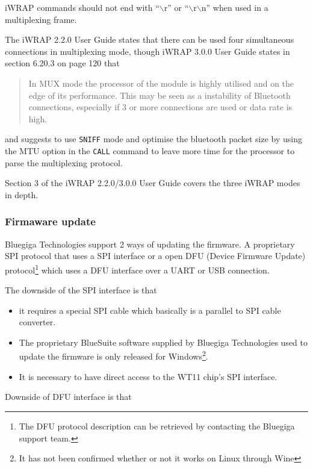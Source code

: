 \documentclass[a4paper, oneside, final]{memoir}
\begin{document}
iWRAP commands should not end with ``$\backslash$r'' or
``$\backslash$r$\backslash$n'' when used in a multiplexing frame.

The iWRAP 2.2.0 User Guide states that there can be used four simultaneous
connections in multiplexing mode, though iWRAP 3.0.0 User Guide\cite{iWRAP300UG}
states in section 6.20.3 on page 120 that 

\begin{quote}
  In MUX mode the processor of the module is highly utilised and on the edge of
  its performance. This may be seen as a instability of Bluetooth connections,
  especially if 3 or more connections are used or data rate is high.
\end{quote}

\noindent
and suggests to use \texttt{SNIFF} mode and optimise the bluetooth packet size
by using the MTU option in the \texttt{CALL} command to leave more time for the
processor to parse the multiplexing protocol. 

Section 3 of the iWRAP 2.2.0/3.0.0 User Guide covers the three iWRAP modes in
depth.


\subsubsection{Firmaware update}

Bluegiga Technologies support 2 ways of updating the firmware. A proprietary SPI
protocol that uses a SPI interface or a open DFU (Device Firmware Update)
protocol\footnote{The DFU protocol description can be retrieved by contacting
  the Bluegiga support team.} which uses a DFU interface over a UART or USB connection.

The downside of the SPI interface is that 

\begin{itemize}
\item it requires a special SPI cable which basically is a parallel to SPI cable
  converter.

\item The proprietary BlueSuite software supplied by Bluegiga Technologies used
  to update the firmware is only released for Windows\footnote{It has not been
    confirmed whether or not it works on Linux through Wine}.

\item It is necessary to have direct access to the WT11 chip's SPI interface.
\end{itemize}

Downside of DFU interface is that 
\end{document}
